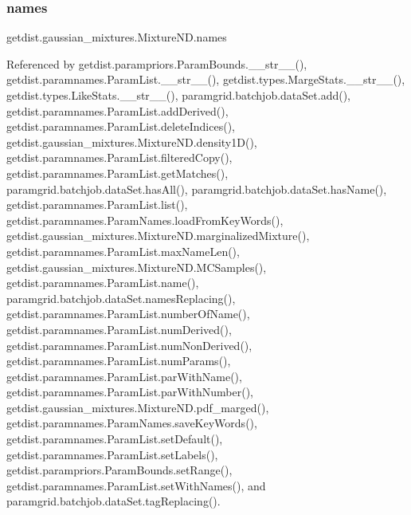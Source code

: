 \subsubsection{\texorpdfstring{names}{names}}
{\footnotesize\ttfamily getdist.\+gaussian\+\_\+mixtures.\+Mixture\+N\+D.\+names}



Referenced by getdist.\+parampriors.\+Param\+Bounds.\+\_\+\+\_\+str\+\_\+\+\_\+(), getdist.\+paramnames.\+Param\+List.\+\_\+\+\_\+str\+\_\+\+\_\+(), getdist.\+types.\+Marge\+Stats.\+\_\+\+\_\+str\+\_\+\+\_\+(), getdist.\+types.\+Like\+Stats.\+\_\+\+\_\+str\+\_\+\+\_\+(), paramgrid.\+batchjob.\+data\+Set.\+add(), getdist.\+paramnames.\+Param\+List.\+add\+Derived(), getdist.\+paramnames.\+Param\+List.\+delete\+Indices(), getdist.\+gaussian\+\_\+mixtures.\+Mixture\+N\+D.\+density1\+D(), getdist.\+paramnames.\+Param\+List.\+filtered\+Copy(), getdist.\+paramnames.\+Param\+List.\+get\+Matches(), paramgrid.\+batchjob.\+data\+Set.\+has\+All(), paramgrid.\+batchjob.\+data\+Set.\+has\+Name(), getdist.\+paramnames.\+Param\+List.\+list(), getdist.\+paramnames.\+Param\+Names.\+load\+From\+Key\+Words(), getdist.\+gaussian\+\_\+mixtures.\+Mixture\+N\+D.\+marginalized\+Mixture(), getdist.\+paramnames.\+Param\+List.\+max\+Name\+Len(), getdist.\+gaussian\+\_\+mixtures.\+Mixture\+N\+D.\+M\+C\+Samples(), getdist.\+paramnames.\+Param\+List.\+name(), paramgrid.\+batchjob.\+data\+Set.\+names\+Replacing(), getdist.\+paramnames.\+Param\+List.\+number\+Of\+Name(), getdist.\+paramnames.\+Param\+List.\+num\+Derived(), getdist.\+paramnames.\+Param\+List.\+num\+Non\+Derived(), getdist.\+paramnames.\+Param\+List.\+num\+Params(), getdist.\+paramnames.\+Param\+List.\+par\+With\+Name(), getdist.\+paramnames.\+Param\+List.\+par\+With\+Number(), getdist.\+gaussian\+\_\+mixtures.\+Mixture\+N\+D.\+pdf\+\_\+marged(), getdist.\+paramnames.\+Param\+Names.\+save\+Key\+Words(), getdist.\+paramnames.\+Param\+List.\+set\+Default(), getdist.\+paramnames.\+Param\+List.\+set\+Labels(), getdist.\+parampriors.\+Param\+Bounds.\+set\+Range(), getdist.\+paramnames.\+Param\+List.\+set\+With\+Names(), and paramgrid.\+batchjob.\+data\+Set.\+tag\+Replacing().

\mbox{\label{classgetdist_1_1gaussian__mixtures_1_1MixtureND_a4998c276678ccda9d6ae0f6479f2dd89}} 
